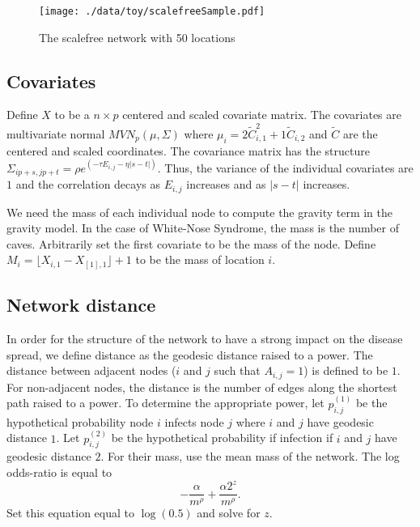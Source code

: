 \documentclass[11pt]{article}
\begin{document}
\begin{figure}[htb]
\centering
\texttt{[image: ./data/toy/scalefreeSample.pdf]}
\caption{\label{fig:scalefree25}The scalefree network with 50 locations}
\end{figure}




\subsection{Covariates}
\label{sec-3-2}

Define $X$ to be a $n \times p$ centered and scaled covariate matrix.
The covariates are multivariate normal $MVN_p(\mu,\Sigma)$ where
$\mu_i = 2\widetilde{C}_{i,1}^2 + 1\widetilde{C}_{i,2}$ and
$\widetilde{C}$ are the centered and scaled coordinates.  The
covariance matrix has the structure $\Sigma_{ip + s, jp + t} =
\rho e^{(-\tau  E_{i,j} - \eta |s-t|)}$.  Thus, the variance of the
individual covariates are $1$ and the correlation decays as $E_{i,j}$
increases and as $|s-t|$ increases.

We need the mass of each individual node to compute the gravity term
in the gravity model.  In the case of White-Nose Syndrome, the mass is
the number of caves.  Arbitrarily set the first covariate to be the
mass of the node.  Define $M_i = \lfloor X_{i,1} - X_{[1],1} \rfloor +
1$ to be the mass of location $i$.


\subsection{Network distance}
\label{sec-3-3}

In order for the structure of the network to have a strong impact on
the disease spread, we define distance as the geodesic distance raised
to a power.  The distance between adjacent nodes ($i$ and $j$ such
that $A_{i,j} = 1$) is defined to be $1$.  For non-adjacent nodes, the
distance is the number of edges along the shortest path raised to a
power.  To determine the appropriate power, let $p^{(1)}_{i,j}$ be the
hypothetical probability node $i$ infects node $j$ where $i$ and $j$
have geodesic distance $1$.  Let $p^{(2)}_{i,j}$ be the hypothetical
probability if infection if $i$ and $j$ have geodesic distance $2$.
For their mass, use the mean mass of the network.  The log odds-ratio
is equal to
\begin{equation*}
  - \frac{\alpha}{m^\rho} + \frac{\alpha2^z}{m^\rho}.
\end{equation*}
Set this equation equal to $\log(0.5)$ and solve for $z$.
\end{document}
